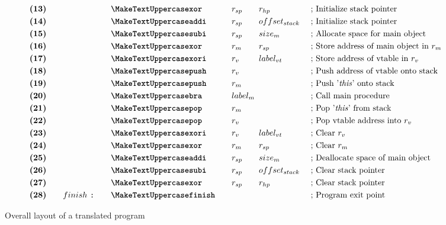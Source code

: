 \begin{figure}[ht]
{\begin{minipage}{\linewidth}
\begin{alignat*}{6}
                &\textbf{(13)}\quad&& &&\inst{xor}\quad &&r_{sp}\quad &&r_{hp} &&\text{; Initialize stack pointer}\\
                &\textbf{(14)}\quad&& &&\inst{addi}\quad &&r_{sp}\quad &&offset_{stack}\ &&\text{; Initialize stack pointer}\\
                &\textbf{(15)}\quad&& &&\inst{subi}\quad &&r_{sp}\quad &&size_m\qquad &&\text{; Allocate space for main object}\\
                &\textbf{(16)}\quad&& &&\inst{xor}\quad &&r_m\quad &&r_{sp}\qquad &&\text{; Store address of main object in $r_m$}\\
                &\textbf{(17)}\quad&& &&\inst{xori}\quad &&r_v\quad &&label_{vt}\qquad &&\text{; Store address of vtable in $r_v$}\\
                &\textbf{(18)}\quad&& &&\inst{push}\quad &&r_v\quad && &&\text{; Push address of vtable onto stack}\\
                &\textbf{(19)}\quad&& &&\inst{push}\quad &&r_m\quad && &&\text{; Push '\textit{this}' onto stack}\\
                &\textbf{(20)}\quad&& &&\inst{bra}\quad &&label_m \span\omit\span \qquad&&\text{; Call main procedure}\\
                &\textbf{(21)}\quad&& &&\inst{pop}\quad &&r_m\quad && &&\text{; Pop '\textit{this}' from stack}\\
                &\textbf{(22)}\quad&& &&\inst{pop}\quad &&r_v\quad && &&\text{; Pop vtable address into $r_v$}\\
                &\textbf{(23)}\quad&& &&\inst{xori}\quad &&r_v\quad &&label_{vt}\qquad &&\text{; Clear $r_v$}\\
                &\textbf{(24)}\quad&& &&\inst{xor}\quad &&r_m\quad &&r_{sp}\qquad &&\text{; Clear $r_m$}\\
                &\textbf{(25)}\quad&& &&\inst{addi}\quad &&r_{sp}\quad &&size_m\qquad &&\text{; Deallocate space of main object}\\
                &\textbf{(26)}\quad&& &&\inst{subi}\quad &&r_{sp}\quad &&offset_{stack} &&\text{; Clear stack pointer}\\
                &\textbf{(27)}\quad&& &&\inst{xor}\quad &&r_{sp}\quad &&r_{hp} &&\text{; Clear stack pointer}\\
                &\textbf{(28)}\quad&&finish\ \texttt{:}\quad&&\inst{finish}\quad && && &&\text{; Program exit point}
            \end{alignat*}
        \end{minipage}
    }
    \caption{Overall layout of a translated \rooplpp program}
    \label{fig:pisa-program-layout}
\end{figure}

